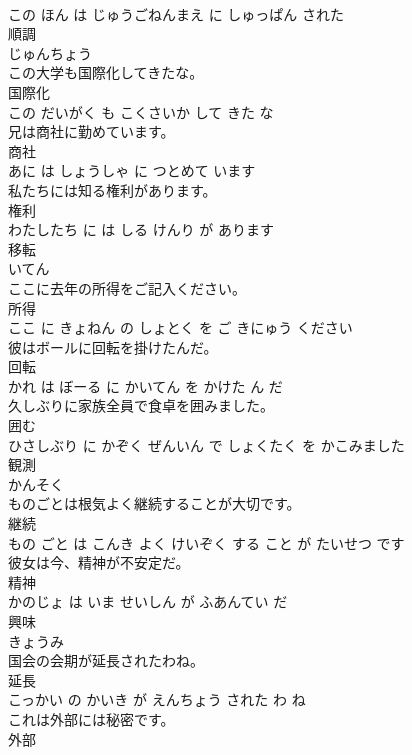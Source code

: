 \documentclass[8pt]{extreport}
\begin{document}
\begin{CJK}{UTF8}{min}
\\	この ほん は じゅうごねんまえ に しゅっぱん された			
\\	順調	
\\	じゅんちょう			
\\	この大学も国際化してきたな。	
\\	国際化 
\\	この だいがく も こくさいか して きた な			
\\	兄は商社に勤めています。	
\\	商社 
\\	あに は しょうしゃ に つとめて います			
\\	私たちには知る権利があります。	
\\	権利 
\\	わたしたち に は しる けんり が あります			
\\	移転	
\\	いてん			
\\	ここに去年の所得をご記入ください。	
\\	所得 
\\	ここ に きょねん の しょとく を ご きにゅう ください			
\\	彼はボールに回転を掛けたんだ。	
\\	回転 
\\	かれ は ぼーる に かいてん を かけた ん だ			
\\	久しぶりに家族全員で食卓を囲みました。	
\\	囲む 
\\	ひさしぶり に かぞく ぜんいん で しょくたく を かこみました			
\\	観測	
\\	かんそく			
\\	ものごとは根気よく継続することが大切です。	
\\	継続 
\\	もの ごと は こんき よく けいぞく する こと が たいせつ です			
\\	彼女は今、精神が不安定だ。	
\\	精神 
\\	かのじょ は いま せいしん が ふあんてい だ			
\\	興味	
\\	きょうみ			
\\	国会の会期が延長されたわね。	
\\	延長 
\\	こっかい の かいき が えんちょう された わ ね			
\\	これは外部には秘密です。	
\\	外部 

\end{CJK}
\end{document}
